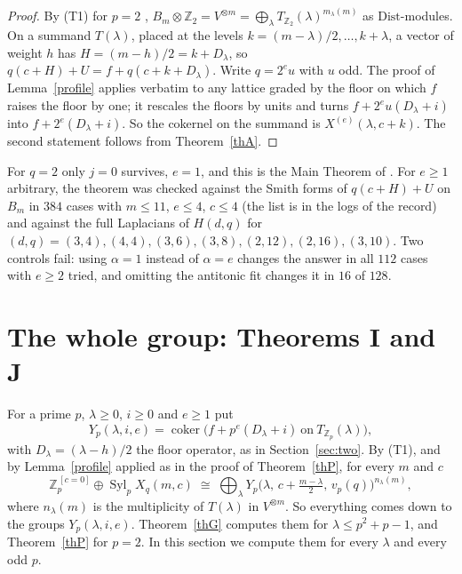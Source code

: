 \documentclass[10pt]{article}
\theoremstyle{ds}
\theoremstyle{dsrem}
\newcommand{\Z}{\mathbb{Z}}
\newcommand{\Syl}{\operatorname{Syl}}
\newcommand{\coker}{\operatorname{coker}}
\begin{document}
\begin{proof}
By (T1) for $p=2$ \cite[Theorem~3.6]{DST}, $B_m\otimes\Z_2=V^{\otimes m}=\bigoplus_\lambda T_{\Z_2}(\lambda)^{m_\lambda(m)}$ as $\mathrm{Dist}$-modules. On a summand $T(\lambda)$, placed at the levels $k=(m-\lambda)/2,\dots,k+\lambda$, a vector of weight $h$ has $H=(m-h)/2=k+D_\lambda$, so $q(c+H)+U=f+q(c+k+D_\lambda)$. Write $q=2^eu$ with $u$ odd. The proof of Lemma~\ref{profile} applies verbatim to any lattice graded by the floor on which $f$ raises the floor by one; it rescales the floors by units and turns $f+2^eu(D_\lambda+i)$ into $f+2^e(D_\lambda+i)$. So the cokernel on the summand is $X^{(e)}(\lambda,c+k)$. The second statement follows from Theorem~\ref{thA}.
\end{proof}

For $q=2$ only $j=0$ survives, $e=1$, and this is the Main Theorem of \cite{DST}. For $e\ge1$ arbitrary, the theorem was checked against the Smith forms of $q(c+H)+U$ on $B_m$ in $384$ cases with $m\le11$, $e\le4$, $c\le4$ (the list is in the logs of the record) and against the full Laplacians of $H(d,q)$ for $(d,q)=(3,4),(4,4),(3,6),(3,8),(2,12),(2,16),(3,10)$. Two controls fail: using $\alpha=1$ instead of $\alpha=e$ changes the answer in all $112$ cases with $e\ge2$ tried, and omitting the antitonic fit changes it in $16$ of $128$.

\section{The whole group: Theorems I and J}\label{sec:conjI}

For a prime $p$, $\lambda\ge0$, $i\ge0$ and $e\ge1$ put
\[
Y_p(\lambda,i,e)=\coker\big(f+p^{e}(D_\lambda+i)\ \text{on}\ T_{\Z_p}(\lambda)\big),
\]
with $D_\lambda=(\lambda-h)/2$ the floor operator, as in Section~\ref{sec:two}. By (T1), and by Lemma~\ref{profile} applied as in the proof of Theorem~\ref{thP}, for every $m$ and $c$
\begin{equation}\label{eq:blocks}
\Z_p^{\,[c=0]}\oplus\Syl_pX_q(m,c)\;\cong\;\bigoplus_\lambda Y_p\big(\lambda,\,c+\tfrac{m-\lambda}2,\,v_p(q)\big)^{n_\lambda(m)},
\end{equation}
where $n_\lambda(m)$ is the multiplicity of $T(\lambda)$ in $V^{\otimes m}$. So everything comes down to the groups $Y_p(\lambda,i,e)$. Theorem~\ref{thG} computes them for $\lambda\le p^2+p-1$, and Theorem~\ref{thP} for $p=2$. In this section we compute them for every $\lambda$ and every odd $p$.
\end{document}
